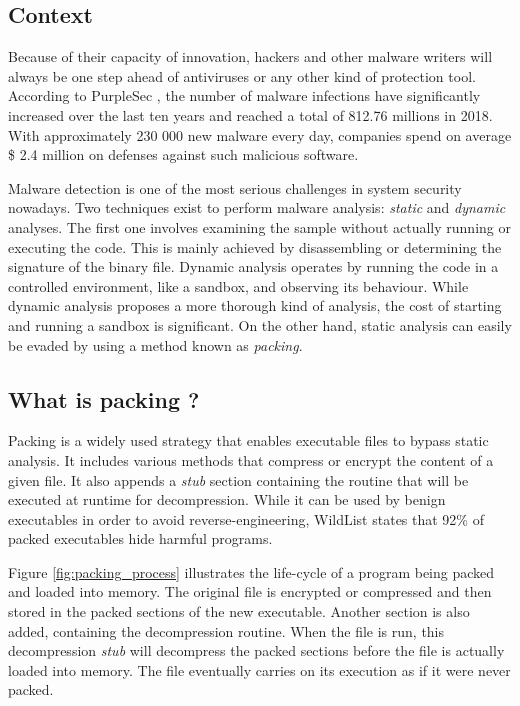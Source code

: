 \setcounter{page}{1}
\subsection*{Context}

Because of their capacity of innovation, hackers and other malware writers will always be one step ahead of antiviruses or any other kind of protection tool. According to PurpleSec \cite{purplesec}, the number of malware infections have significantly increased over the last ten years and reached a total of 812.76 millions in 2018. With approximately 230 000 new malware every day, companies spend on average \$ 2.4 million on defenses against such malicious software.

Malware detection is one of the most serious challenges in system security nowadays. Two techniques exist to perform malware analysis: \textit{static} and \textit{dynamic} analyses. The first one involves examining the sample without actually running or executing the code. This is mainly achieved by disassembling or determining the signature of the binary file. Dynamic analysis operates by running the code in a controlled environment, like a sandbox, and observing its behaviour. While dynamic analysis proposes a more thorough kind of analysis, the cost of starting and running a sandbox is significant. On the other hand, static analysis can easily be evaded by using a method known as \textit{packing}.

\subsection*{What is packing ?}

Packing is a widely used strategy that enables executable files to bypass static analysis. It includes various methods that compress or encrypt the content of a given file. It also appends a \textit{stub} section containing the routine that will be executed at runtime for decompression. While it can be used by benign executables in order to avoid reverse-engineering, WildList states that 92\% of packed executables hide harmful programs.

Figure \ref{fig:packing_process} illustrates the life-cycle of a program being packed and loaded into memory. The original file is encrypted or compressed and then stored in the packed sections of the new executable. Another section is also added, containing the decompression routine. When the file is run, this decompression \textit{stub} will decompress the packed sections before the file is actually loaded into memory. The file eventually carries on its execution as if it were never packed.

